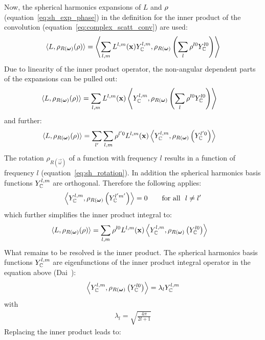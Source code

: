 Now, the spherical harmonics expansions of $L$ and $\rho$ (equation~\ref{eq:sh_exp_phase}) in the definition for the inner product of the convolution (equation~\ref{eq:complex_scatt_conv}) are used:
\begin{align*}
\langle L,  \rho_{R(\boldsymbol{\mathbf{\omega}})}(\rho)\rangle = \left < \sum_{l,m}{L^{l,m}(\boldsymbol{\mathbf{x}}) Y_{\mathbb{C}}^{l,m}}, \rho_{R(\boldsymbol{\mathbf{\omega}})}\left ( \sum_{l}{\rho^{l0}Y_{\mathbb{C}}^{l0}} \right )\right>
\end{align*}
Due to linearity of the inner product operator, the non-angular dependent parts of the expansions can be pulled out:
\begin{align*}
\langle L,  \rho_{R(\boldsymbol{\mathbf{\omega}})}(\rho)\rangle
&=
\sum_{l,m}
{
L^{l,m}(\boldsymbol{\mathbf{x}})
\left<
Y_{\mathbb{C}}^{l,m},
\rho_{R(\boldsymbol{\mathbf{\omega}})}
\left(\sum_l{\rho^{l0} Y_{\mathbb{C}}^{l0}}\right)
\right>
}
\end{align*}
and further:
\begin{align*}
\langle L,  \rho_{R(\boldsymbol{\mathbf{\omega}})}(\rho)\rangle
&=
\sum_{l'}
{
\sum_{l,m}
{
\rho^{l'0}L^{l,m}(\boldsymbol{\mathbf{x}})
\left<Y_{\mathbb{C}}^{l,m}, \rho_{R(\boldsymbol{\mathbf{\omega}})}\left( Y_{\mathbb{C}}^{l'0} \right)\right>
}
}
\end{align*}
The rotation $\rho_{R(\vec{\omega})}$ of a function with frequency $l$ results in a function of frequency $l$ (equation~\ref{eq:sh_rotation}). In addition the spherical harmonics basis functions $Y_{\mathbb{C}}^{l,m}$ are orthogonal. Therefore the following applies:
\begin{align*}
\left<
Y_{\mathbb{C}}^{l,m}, \rho_{R(\boldsymbol{\mathbf{\omega}})}\left(Y_{\mathbb{C}}^{l'm'}\right)
\right> = 0       \qquad    \text{for all}\ \ l\ne l' 
\end{align*}
which further simplifies the inner product integral to:
\begin{align*}
\langle L,  \rho_{R(\boldsymbol{\mathbf{\omega}})}(\rho)\rangle
&=
\sum_{l,m}
{
\rho^{l0}L^{l,m}(\boldsymbol{\mathbf{x}})
\left<
Y_{\mathbb{C}}^{l,m}, \rho_{R(\boldsymbol{\mathbf{\omega}})}\left(Y_{\mathbb{C}}^{l0} \right )
\right>
}
\end{align*}
What remains to be resolved is the inner product. The spherical harmonics basis functions $ Y_{\mathbb{C}}^{l,m}$ are eigenfunctions of the inner product integral operator in the equation above (Dai~\cite{Dai13}):
\begin{align*}
\left<
Y_{\mathbb{C}}^{l,m}, \rho_{R(\boldsymbol{\mathbf{\omega}})}\left ( Y_{\mathbb{C}}^{l0} \right )\right> = \lambda_l Y_{\mathbb{C}}^{l,m}
\end{align*}
with
\begin{align*}
\lambda_l=\sqrt{\frac{4\pi}{2l+1}}
\end{align*}
Replacing the inner product leads to:
